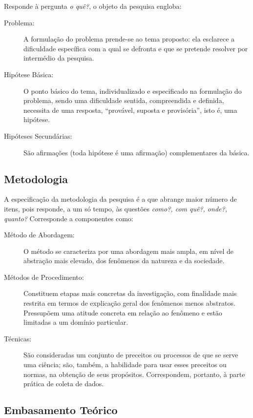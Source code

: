 \documentclass[
	12pt,				%
    oneside,			%
	a4paper,			%
	english,			%
	french,				%
	spanish,			%
	brazil				%
	]{abntex2}
\begin{document}
Responde à pergunta \emph{o quê?}, o objeto da pesquisa engloba:

\begin{description}
    \item[Problema:] A formulação do problema prende-se ao tema
    proposto: ela esclarece a dificuldade específica com a qual se
    defronta e que se pretende resolver por intermédio da
    pesquisa.

    \item[Hipótese Básica:] O ponto básico do tema, individualizado
    e especificado na formulação do problema, sendo uma
    dificuldade sentida, compreendida e definida, necessita de uma
    resposta, ``provável, suposta e provisória'', isto é, uma
    hipótese.

    \item[Hipóteses Secundárias:] São afirmações (toda hipótese é
    uma afirmação) complementares da básica.
\end{description}

\subsection{Metodologia}

A especificação da metodologia da pesquisa é a que abrange maior
número de itens, pois responde, a um só tempo, às questões
\emph{como?, com quê?, onde?, quanto?} Corresponde a componentes
como:

\begin{description}
    \item[Método de Abordagem:] O método se caracteriza por uma
    abordagem mais ampla, em nível de abstração mais elevado, dos
    fenômenos da natureza e da sociedade.
    \item[Métodos de Procedimento:] Constituem etapas mais
    concretas da investigação, com finalidade mais restrita em
    termos de explicação geral dos fenômenos menos abstratos.
    Pressupõem uma atitude concreta em relação ao fenômeno e estão
    limitadas a um domínio particular.
    \item[Técnicas:] São consideradas um conjunto de preceitos ou
    processos de que se serve uma ciência; são, também, a
    habilidade para usar esses preceitos ou normas, na obtenção de
    seus propósitos. Correspondem, portanto, à parte prática de
    coleta de dados.
\end{description}

\subsection{Embasamento Teórico}
\end{document}
